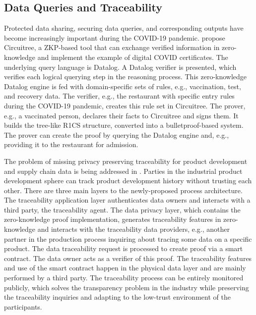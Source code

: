 \subsection{Data Queries and Traceability}
Protected data sharing, securing data queries, and corresponding outputs have become increasingly important during the COVID-19 pandemic. \citet{Godden} propose Circuitree, a ZKP-based tool that can exchange verified information in zero-knowledge and implement the example of digital COVID certificates. The underlying query language is Datalog. A Datalog verifier is presented, which verifies each logical querying step in the reasoning process. This zero-knowledge Datalog engine is fed with domain-specific sets of rules, e.g., vaccination, test, and recovery data. The verifier, e.g., the restaurant with specific entry rules during the COVID-19 pandemic, creates this rule set in Circuitree. The prover, e.g., a vaccinated person, declares their facts to Circuitree and signs them. It builds the tree-like R1CS structure, converted into a bulletproof-based system. The prover can create the proof by querying the Datalog engine and, e.g., providing it to the restaurant for admission.

The problem of missing privacy preserving traceability for product development and supply chain data is being addressed in \citet{XueWang}. Parties in the industrial product development sphere can track product development history without trusting each other. There are three main layers to the newly-proposed process architecture. The traceability application layer authenticates data owners and interacts with a third party, the traceability agent. The data privacy layer, which contains the zero-knowledge proof implementation, generates traceability features in zero-knowledge and interacts with the traceability data providers, e.g., another partner in the production process inquiring about tracing some data on a specific product. The data traceability request is processed to create proof via a smart contract. The data owner acts as a verifier of this proof. The traceability features and use of the smart contract happen in the physical data layer and are mainly performed by a third party. The traceability process can be entirely monitored publicly, which solves the transparency problem in the industry while preserving the traceability inquiries and adapting to the low-trust environment of the participants.

